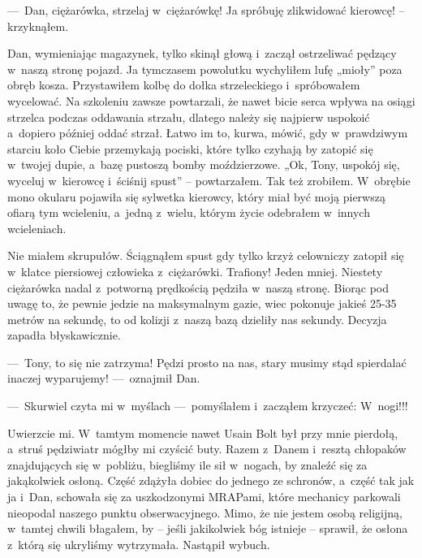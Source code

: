 ---~Dan, ciężarówka, strzelaj w~ciężarówkę! Ja spróbuję zlikwidować kierowcę! – krzyknąłem.

Dan, wymieniając magazynek, tylko skinął głową i~zaczął ostrzeliwać pędzący w~naszą stronę pojazd. Ja tymczasem powolutku wychyliłem lufę „mioły” poza obręb kosza. Przystawiłem kolbę do dołka strzeleckiego i~spróbowałem wycelować. Na szkoleniu zawsze powtarzali, że nawet bicie serca wpływa na osiągi strzelca podczas oddawania strzału, dlatego należy się najpierw uspokoić a~dopiero później oddać strzał. Łatwo im to, kurwa, mówić, gdy w~prawdziwym starciu koło Ciebie przemykają pociski, które tylko czyhają by zatopić się w~twojej dupie, a~bazę pustoszą bomby moździerzowe. „Ok, Tony, uspokój się, wyceluj w~kierowcę i~ściśnij spust” -- powtarzałem. Tak też zrobiłem. W~obrębie mono okularu pojawiła się sylwetka kierowcy, który miał być moją pierwszą ofiarą tym wcieleniu, a~jedną z~wielu, którym życie odebrałem w~innych wcieleniach.

Nie miałem skrupułów. Ściągnąłem spust gdy tylko krzyż celowniczy zatopił się w~klatce piersiowej człowieka z~ciężarówki. Trafiony! Jeden mniej. Niestety ciężarówka nadal z~potworną prędkością pędziła w~naszą stronę. Biorąc pod uwagę to, że pewnie jedzie na maksymalnym gazie, wiec pokonuje jakieś 25-35 metrów na sekundę, to od kolizji z~naszą bazą dzieliły nas sekundy. Decyzja zapadła błyskawicznie.

---~Tony, to się nie zatrzyma! Pędzi prosto na nas, stary musimy stąd spierdalać inaczej wyparujemy! ---~oznajmił Dan.

---~Skurwiel czyta mi w~myślach ---~pomyślałem i~zacząłem krzyczeć: W~nogi!!! 

Uwierzcie mi. W~tamtym momencie nawet Usain Bolt był przy mnie pierdołą, a~struś pędziwiatr mógłby mi czyścić buty. Razem z~Danem i~resztą chłopaków znajdujących się w~pobliżu, biegliśmy ile sił w~nogach, by znaleźć się za jakąkolwiek osłoną. Część zdążyła dobiec do jednego ze schronów, a~część tak jak ja i~Dan, schowała się za uszkodzonymi MRAPami, które mechanicy parkowali nieopodal naszego punktu obserwacyjnego. Mimo, że nie jestem osobą religijną, w~tamtej chwili błagałem, by -- jeśli jakikolwiek bóg istnieje -- sprawił, że osłona z~którą się ukryliśmy wytrzymała. Nastąpił wybuch.
